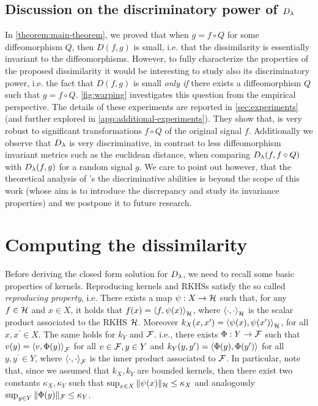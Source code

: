 \subsection{Discussion on the discriminatory power of $D_\lambda$} \label{sec:discussion-selectivity}
In \cref{theorem:main-theorem}, we proved that when $g = f \circ Q$ for some diffeomorphism $Q$, then $D(f,g)$ is small, i.e. that the dissimilarity is essentially invariant to the diffeomorphisms. However, to fully characterize the properties of the proposed dissimilarity it would be interesting to study also its discriminatory power, i.e. the fact that $D(f,g)$ is small {\em only if} there exists a diffeomorphism $Q$ such that $g = f \circ Q$. \cref{fig:warping} investigates this question from the empirical perspective. The details of these experiments are reported in \cref{sec:experiments} (and further explored in \cref{app:additional-experiments}). They show that, \Diffy is very robust to significant transformations $f\circ Q$ of the original signal $f$. Additionally we observe that $D_\lambda$ is very discriminative, in contrast to less diffeomorphism invariant metrics such as the euclidean distance, when comparing $D_\lambda(f,f\circ Q)$ with $D_\lambda(f,g)$ for a random signal $g$. We care to point out however, that the theoretical analysis of \Diffy's the discriminative abilities is beyond the scope of this work (whose aim is to introduce the discrepancy and study its invariance properties) and we postpone it to future research.





\section{Computing the dissimilarity}\label{sec:computing}

Before deriving the closed form solution for $D_\lambda$, we need to recall some basic properties of kernels. Reproducing kernels and RKHSs satisfy the so called {\em reproducing property}, i.e. There exists a map $\psi:X \to \mathcal H$ such that, for any $f \in \mathcal H$ and $x \in X$, it holds that $f(x) = \left\langle{f},{\psi(x)}\right\rangle_\mathcal H$, where $\left\langle{\cdot},{\cdot}\right\rangle_\mathcal H$ is the scalar product associated to the RKHS $\mathcal H$. Moreover $k_X(x,x^\prime) = \left\langle{\psi(x)},{\psi(x^\prime)}\right\rangle_{\mathcal H}$, for all $x,x^\prime \in X$. The same holds for $k_Y$ and $\cal F$. i.e., there exists $\Phi:Y \to {\cal F}$ such that $v(y) = \left\langle{v},{\Phi(y)}\right\rangle_{\cal F}$ for all $v \in {\cal F}, y \in Y$ and $k_Y(y,y^\prime) = \left\langle{\Phi(y)},{\Phi(y^\prime)}\right\rangle$ for all $y,y^\prime \in Y$, where $\left\langle{\cdot},{\cdot}\right\rangle_{\cal F}$ is the inner product associated to ${\cal F}$. In particular, note that, since we assumed that $k_X, k_Y$ are bounded kernels, then there exist two constants $\kappa_X, \kappa_Y$ such that $\sup_{x \in X} \|\psi(x)\|_{\mathcal H} \leq \kappa_X$ and analogously $\sup_{y \in Y} \|\Phi(y)\|_{\cal F} \leq \kappa_Y$.



